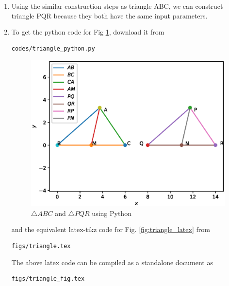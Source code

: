 \begin{enumerate}[label=\thesection.\arabic*.,ref=\thesection.\theenumi]
%
%
\item Using the similar construction steps as triangle ABC, we can construct triangle PQR because they both have the same input parameters.
%
\item To get the python code for Fig \ref{fig:triangle_python}, download it from
\begin{lstlisting}
codes/triangle_python.py
\end{lstlisting}
\begin{figure}[!ht]
\centering
\includegraphics[width= \columnwidth]{Figure_1.eps}
\caption{$\triangle ABC$ and $\triangle PQR$ using Python}
\label{fig:triangle_python}
\end{figure}
%
and the equivalent latex-tikz code for Fig. \ref{fig:triangle_latex} from
\begin{lstlisting}
figs/triangle.tex
\end{lstlisting}
%
The above latex code can be compiled as a standalone document as
\begin{lstlisting}
figs/triangle_fig.tex
\end{lstlisting}



\end{enumerate}